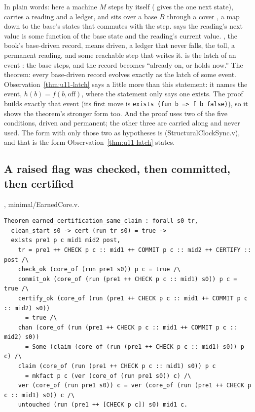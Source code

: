 In plain words: here a machine $M$ steps by itself ( gives the one next
state), carries a reading  and a ledger, and sits over a base $B$ through a
cover , a map down to the base's states that commutes with the step.
 says the reading's next value is some function  of the base
state and the reading's current value. , the book's base-driven record, means driven, a ledger that never falls, the
toll, a permanent reading, and some reachable step that writes it.  is the
latch of an event : the base steps, and the record becomes ``already on, or 
holds now.'' The theorem: every base-driven record evolves exactly as the latch of some event.
Observation~\ref{thm:u11-latch} says a little more than this statement: it names the event,
$h(b) = f(b, \mathrm{off})$, where the statement only says one exists. The proof builds exactly
that event (its first move is \texttt{exists (fun b => f b false)}), so it shows the theorem's
stronger form too. And the proof uses two of the five
conditions, driven and permanent; the other three are carried along and never used. The form
with only those two as hypotheses is 
(StructuralClockSync.v), and that is the form Observation~\ref{thm:u11-latch} states.

\subsection{A raised flag was checked, then committed, then certified}

{\raggedright {}, minimal/EarnedCore.v.\par}

{\tiny
\begin{verbatim}
Theorem earned_certification_same_claim : forall s0 tr,
  clean_start s0 -> cert (run tr s0) = true ->
  exists pre1 p c mid1 mid2 post,
    tr = pre1 ++ CHECK p c :: mid1 ++ COMMIT p c :: mid2 ++ CERTIFY :: post /\
    check_ok (core_of (run pre1 s0)) p c = true /\
    commit_ok (core_of (run (pre1 ++ CHECK p c :: mid1) s0)) p c = true /\
    certify_ok (core_of (run (pre1 ++ CHECK p c :: mid1 ++ COMMIT p c :: mid2) s0))
      = true /\
    chan (core_of (run (pre1 ++ CHECK p c :: mid1 ++ COMMIT p c :: mid2) s0))
      = Some (claim (core_of (run (pre1 ++ CHECK p c :: mid1) s0)) p c) /\
    claim (core_of (run (pre1 ++ CHECK p c :: mid1) s0)) p c
      = mkfact p c (ver (core_of (run pre1 s0)) c) /\
    ver (core_of (run pre1 s0)) c = ver (core_of (run (pre1 ++ CHECK p c :: mid1) s0)) c /\
    untouched (run (pre1 ++ [CHECK p c]) s0) mid1 c.
\end{verbatim}}


